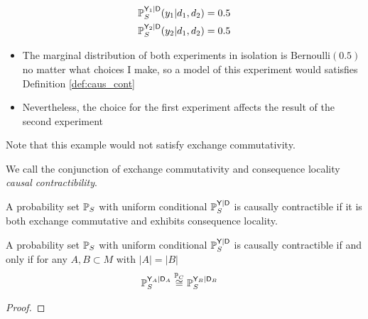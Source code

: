 \begin{align}
    \mathbb{P}_S^{\mathsf{Y}_1|\mathsf{D}}(y_1|d_1,d_2) &= 0.5\\
    \mathbb{P}_S^{\mathsf{Y}_2|\mathsf{D}}(y_2|d_1,d_2) &= 0.5
\end{align}
\begin{itemize}
    \item The marginal distribution of both experiments in isolation is $\text{Bernoulli}(0.5)$ no matter what choices I make, so a model of this experiment would satisfies Definition \ref{def:caus_cont}
    \item Nevertheless, the choice for the first experiment affects the result of the second experiment
\end{itemize}

Note that this example would not satisfy exchange commutativity.

We call the conjunction of exchange commutativity and consequence locality \emph{causal contractibility}.

\begin{definition}
A probability set $\mathbb{P}_S$ with uniform conditional $\mathbb{P}_S^{\mathsf{Y}|\mathsf{D}}$ is causally contractible if it is both exchange commutative and exhibits consequence locality.
\end{definition}

\begin{theorem}
A probability set $\mathbb{P}_S$ with uniform conditional $\mathbb{P}_S^{\mathsf{Y}|\mathsf{D}}$ is causally contractible if and only if for any $A,B\subset M$ with $|A|=|B|$
\begin{align}
    \mathbb{P}_S^{\mathsf{Y}_A|\mathsf{D}_A} &\overset{\mathbb{P}_C}{\cong} \mathbb{P}_S^{\mathsf{Y}_B|\mathsf{D}_B}
\end{align}
\end{theorem}

\begin{proof}

\end{proof}


